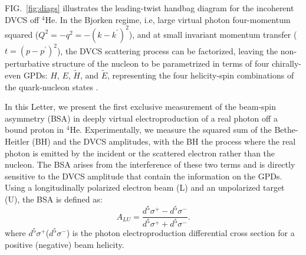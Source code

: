 \documentclass[twocolumn,nofootinbib,showpacs,prl,superscriptaddress,secnumarabic,amssymb,nobibnotes,aps,floatfix]{revtex4}
\begin{document}
FIG.~\ref{fig:diags} illustrates the 
leading-twist handbag diagram for the incoherent DVCS off $^{4}$He. In the 
Bjorken regime, i.e, large virtual photon four-momentum squared 
($Q^{2}=-q^2=-(k-k^\prime)^2$), and at small invariant momentum transfer ($t=(p-p^\prime)^2$), the 
DVCS scattering process can be factorized, leaving the non-perturbative structure 
of the nucleon to be parametrized in terms of four chirally-even GPDs: $H$, 
$E$, $\widetilde{H}$, and $\widetilde{E}$, representing the four helicity-spin 
combinations of the quark-nucleon states \cite{Freund_Collins,Ji_Osborne}.

In this Letter, we present the first exclusive measurement of the beam-spin 
asymmetry (BSA) in deeply virtual electroproduction of a real photon off a bound 
proton in $^{4}$He. Experimentally, we measure the squared sum of the 
Bethe-Heitler (BH) and the DVCS amplitudes, with the BH the process 
where the real photon is emitted by the incident or the scattered electron 
rather than the nucleon. The BSA arises from the interference 
of these two terms and is directly sensitive to the DVCS amplitude that contain 
the information on the GPDs.  Using a longitudinally polarized electron beam 
(L) and an unpolarized target (U), the BSA is defined as:
\begin{equation}
  A_{LU} = \frac{d^{5}\sigma^{+} - d^{5}\sigma^{-} }
                {d^{5}\sigma^{+} + d^{5}\sigma^{-}}.
    \label{BSA_equation}
  \end{equation}
where $d^{5}\sigma^{+}$($d^{5}\sigma^{-}$) is the photon electroproduction 
differential cross section for a positive (negative) beam helicity. 
\end{document}
